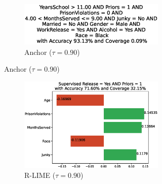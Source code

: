 \documentclass[runningheads]{llncs}
\begin{document}
{\begin{figure}[t]
\begin{subfigure}[t]{0.45\textwidth}
        \vspace{10pt}
        \begin{subfigure}[t]{\textwidth}
          \centering
          \includegraphics[scale=0.33]{src/experiments/exp1/anchor-0011-90}  %
          \caption{Anchor ($\tau=0.90$)}
          \vspace{1.0em}
        \end{subfigure}
      \end{subfigure}
      \hfill
      \begin{subfigure}[t]{0.45\textwidth}
        \begin{subfigure}[t]{\textwidth}
          \hspace{-5pt}
          \includegraphics[scale=\scale]{src/experiments/exp1/rlime-0011-70}  %
          \caption{R-LIME ($\tau=0.90$)}
        \end{subfigure}
        \begin{subfigure}[t]{\textwidth}
          \hspace{-20pt}

\end{subfigure}
\end{subfigure}
\end{figure}}
\end{document}

